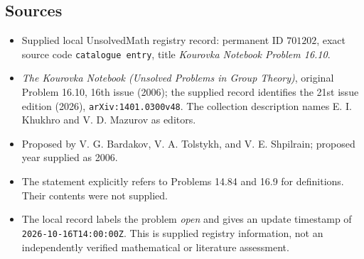 \documentclass[11pt]{article}
\begin{document}
\subsection{Sources}
\begin{itemize}
\item Supplied local UnsolvedMath registry record: permanent ID \(701202\), exact source code \texttt{catalogue entry}, title \emph{Kourovka Notebook Problem 16.10}.
\item \emph{The Kourovka Notebook (Unsolved Problems in Group Theory)}, original Problem 16.10, 16th issue (2006); the supplied record identifies the 21st issue edition (2026), \texttt{arXiv:1401.0300v48}. The collection description names E. I. Khukhro and V. D. Mazurov as editors.
\item Proposed by V. G. Bardakov, V. A. Tolstykh, and V. E. Shpilrain; proposed year supplied as 2006.
\item The statement explicitly refers to Problems 14.84 and 16.9 for definitions. Their contents were not supplied.
\item The local record labels the problem \emph{open} and gives an update timestamp of \texttt{2026-10-16T14:00:00Z}. This is supplied registry information, not an independently verified mathematical or literature assessment.
\end{itemize}
\end{document}
